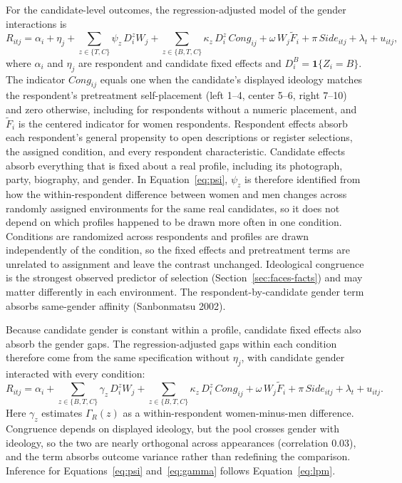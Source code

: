 \documentclass[11pt]{article}\usepackage[]{graphicx}\usepackage[]{xcolor}
\begin{document}
For the candidate-level outcomes, the regression-adjusted model of the gender interactions is
\begin{equation}
R_{itj}=\alpha_i+\eta_j+\sum_{z\in\{T,C\}}\psi_z\,D^z_iW_j+\sum_{z\in\{B,T,C\}}\kappa_z\,D^z_i\,\mathit{Cong}_{ij}+\omega\,W_j\tilde F_i+\pi\,\mathit{Side}_{itj}+\lambda_t+u_{itj},
\label{eq:psi}
\end{equation}
where $\alpha_i$ and $\eta_j$ are respondent and candidate fixed effects and $D^B_i=\mathbf 1\{Z_i=B\}$. The indicator $\mathit{Cong}_{ij}$ equals one when the candidate's displayed ideology matches the respondent's pretreatment self-placement (left 1--4, center 5--6, right 7--10) and zero otherwise, including for respondents without a numeric placement, and $\tilde F_i$ is the centered indicator for women respondents. Respondent effects absorb each respondent's general propensity to open descriptions or register selections, the assigned condition, and every respondent characteristic. Candidate effects absorb everything that is fixed about a real profile, including its photograph, party, biography, and gender. In Equation~\eqref{eq:psi}, $\psi_z$ is therefore identified from how the within-respondent difference between women and men changes across randomly assigned environments for the same real candidates, so it does not depend on which profiles happened to be drawn more often in one condition. Conditions are randomized across respondents and profiles are drawn independently of the condition, so the fixed effects and pretreatment terms are unrelated to assignment and leave the contrast unchanged. Ideological congruence is the strongest observed predictor of selection (Section~\ref{sec:faces-facts}) and may matter differently in each environment. The respondent-by-candidate gender term absorbs same-gender affinity (Sanbonmatsu 2002).

Because candidate gender is constant within a profile, candidate fixed effects also absorb the gender gaps. The regression-adjusted gaps within each condition therefore come from the same specification without $\eta_j$, with candidate gender interacted with every condition:
\begin{equation}
R_{itj}=\alpha_i+\sum_{z\in\{B,T,C\}}\gamma_z\,D^z_iW_j+\sum_{z\in\{B,T,C\}}\kappa_z\,D^z_i\,\mathit{Cong}_{ij}+\omega\,W_j\tilde F_i+\pi\,\mathit{Side}_{itj}+\lambda_t+u_{itj}.
\label{eq:gamma}
\end{equation}
Here $\gamma_z$ estimates $\Gamma_R(z)$ as a within-respondent women-minus-men difference. Congruence depends on displayed ideology, but the pool crosses gender with ideology, so the two are nearly orthogonal across appearances (correlation 0.03), and the term absorbs outcome variance rather than redefining the comparison. Inference for Equations~\eqref{eq:psi} and~\eqref{eq:gamma} follows Equation~\eqref{eq:lpm}.
\end{document}
